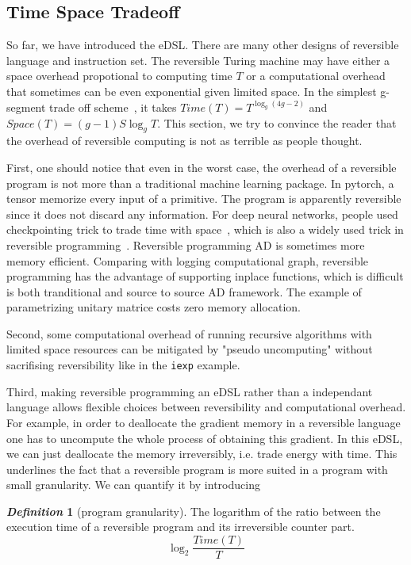 \documentclass[aps,twocolumn,longbibliography,english,superscriptaddress,prr]{revtex4-1}
\newcommand{\<}{\langle}
\renewcommand{\>}{\rangle}
\theoremstyle{definition}\newtheorem{definition}{\textit{Definition}}
\begin{document}
\subsection{Time Space Tradeoff}\label{sec:timespace}
So far, we have introduced the eDSL. There are many other designs of reversible language and instruction set.
The reversible Turing machine may have either a space overhead propotional to computing time $T$ or a computational overhead that sometimes can be even exponential given limited space.
In the simplest g-segment trade off scheme~\cite{Bennett1989,Levine1990}, it takes $Time(T) = T^{\log _g(4g-2)}$ and $Space(T) = (g-1)S\log_g T$.
This section, we try to convince the reader that the overhead of reversible computing is not as terrible as people thought.

First, one should notice that even in the worst case, the overhead of a reversible program is not more than a traditional machine learning package. In pytorch, a tensor memorize every input of a primitive. The program is apparently reversible since it does not discard any information.
For deep neural networks, people used checkpointing trick to trade time with space~\cite{Chen2016}, which is also a widely used trick in reversible programming~\cite{Perumalla2013}. Reversible programming AD is sometimes more memory efficient. Comparing with logging computational graph, reversible programming has the advantage of supporting inplace functions, which is difficult is both tranditional and source to source AD framework. The example of parametrizing unitary matrice costs zero memory allocation.

Second, some computational overhead of running recursive algorithms with limited space resources can be mitigated by "pseudo uncomputing" without sacrifising reversibility like in the \texttt{iexp} example.

Third, making reversible programming an eDSL rather than a independant language allows flexible choices between reversibility and computational overhead. For example, in order to deallocate the gradient memory in a reversible language one has to uncompute the whole process of obtaining this gradient.
In this eDSL, we can just deallocate the memory irreversibly, i.e. trade energy with time. This underlines the fact that a reversible program is more suited in a program with small granularity. We can quantify it by introducing
\begin{definition}[program granularity]
    The logarithm of the ratio between the execution time of a reversible program and its irreversible counter part.
    \begin{equation}
        \log_2 \frac{Time(T)}{T}
    \end{equation}
\end{definition}
\end{document}
